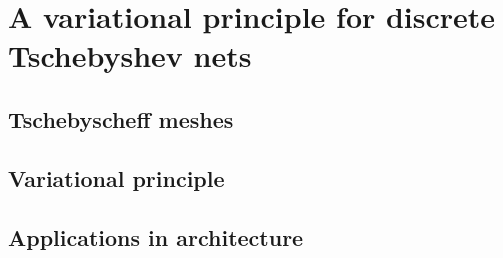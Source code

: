 
\section{A variational principle for discrete Tschebyshev nets}
\subsection{Tschebyscheff meshes}
\subsection{Variational principle}
\subsection{Applications in architecture}

